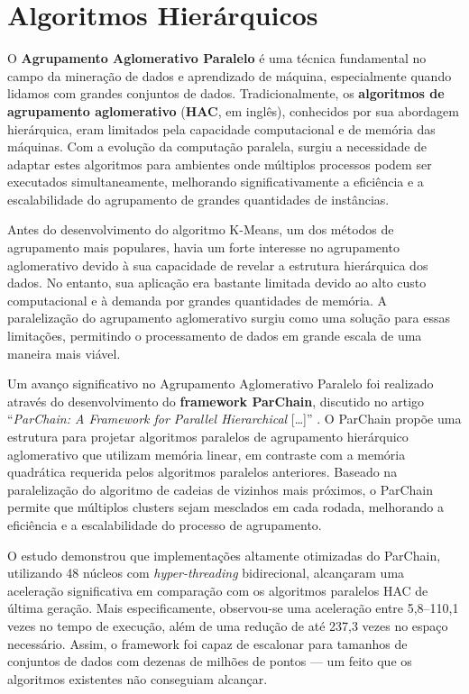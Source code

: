 \documentclass[12pt, %
openright, 
oneside, %
a4paper,    %
brazil]{facom-ufu-abntex2}
\begin{document}

\section{Algoritmos Hierárquicos}

O \textbf{Agrupamento Aglomerativo Paralelo} é uma técnica fundamental no campo da mineração de dados e aprendizado de máquina, especialmente quando lidamos com grandes conjuntos de dados. Tradicionalmente, os \textbf{algoritmos de agrupamento aglomerativo} (\textbf{HAC}, em inglês), conhecidos por sua abordagem hierárquica, eram limitados pela capacidade computacional e de memória das máquinas. Com a evolução da computação paralela, surgiu a necessidade de adaptar estes algoritmos para ambientes onde múltiplos processos podem ser executados simultaneamente, melhorando significativamente a eficiência e a escalabilidade do agrupamento de grandes quantidades de instâncias.

Antes do desenvolvimento do algoritmo K-Means, um dos métodos de agrupamento mais populares, havia um forte interesse no agrupamento aglomerativo devido à sua capacidade de revelar a estrutura hierárquica dos dados. No entanto, sua aplicação era bastante limitada devido ao alto custo computacional e à demanda por grandes quantidades de memória. A paralelização do agrupamento aglomerativo surgiu como uma solução para essas limitações, permitindo o processamento de dados em grande escala de uma maneira mais viável.

Um avanço significativo no Agrupamento Aglomerativo Paralelo foi realizado através do desenvolvimento do \textbf{framework ParChain}, discutido no artigo \enquote{\textit{ParChain: A Framework for Parallel Hierarchical} [\dots]} \cite{parChainHAC2021}. O ParChain propõe uma estrutura para projetar algoritmos paralelos de agrupamento hierárquico aglomerativo que utilizam memória linear, em contraste com a memória quadrática requerida pelos algoritmos paralelos anteriores. Baseado na paralelização do algoritmo de cadeias de vizinhos mais próximos, o ParChain permite que múltiplos clusters sejam mesclados em cada rodada, melhorando a eficiência e a escalabilidade do processo de agrupamento.

O estudo demonstrou que implementações altamente otimizadas do ParChain, utilizando 48 núcleos com \textit{hyper-threading} bidirecional, alcançaram uma aceleração significativa em comparação com os algoritmos paralelos HAC de última geração. Mais especificamente, observou-se uma aceleração entre 5,8--110,1 vezes no tempo de execução, além de uma redução de até 237,3 vezes no espaço necessário. Assim, o framework foi capaz de escalonar para tamanhos de conjuntos de dados com dezenas de milhões de pontos --- um feito que os algoritmos existentes não conseguiam alcançar.
\end{document}

